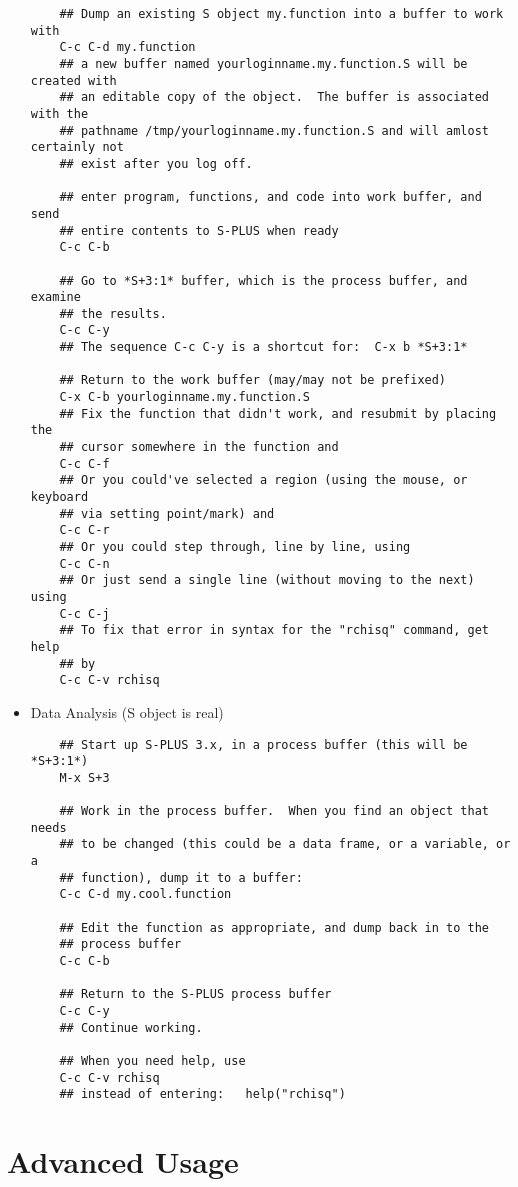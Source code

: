 \documentclass{article}
\begin{document}
\begin{itemize}
\begin{verbatim}
    ## Dump an existing S object my.function into a buffer to work with
    C-c C-d my.function
    ## a new buffer named yourloginname.my.function.S will be created with
    ## an editable copy of the object.  The buffer is associated with the
    ## pathname /tmp/yourloginname.my.function.S and will amlost certainly not
    ## exist after you log off.

    ## enter program, functions, and code into work buffer, and send
    ## entire contents to S-PLUS when ready
    C-c C-b

    ## Go to *S+3:1* buffer, which is the process buffer, and examine
    ## the results.
    C-c C-y
    ## The sequence C-c C-y is a shortcut for:  C-x b *S+3:1*

    ## Return to the work buffer (may/may not be prefixed)
    C-x C-b yourloginname.my.function.S
    ## Fix the function that didn't work, and resubmit by placing the
    ## cursor somewhere in the function and
    C-c C-f
    ## Or you could've selected a region (using the mouse, or keyboard 
    ## via setting point/mark) and 
    C-c C-r
    ## Or you could step through, line by line, using 
    C-c C-n
    ## Or just send a single line (without moving to the next) using
    C-c C-j
    ## To fix that error in syntax for the "rchisq" command, get help
    ## by
    C-c C-v rchisq
\end{verbatim}
\item Data Analysis (S object is real)
\begin{verbatim}
    ## Start up S-PLUS 3.x, in a process buffer (this will be *S+3:1*) 
    M-x S+3

    ## Work in the process buffer.  When you find an object that needs 
    ## to be changed (this could be a data frame, or a variable, or a 
    ## function), dump it to a buffer:
    C-c C-d my.cool.function

    ## Edit the function as appropriate, and dump back in to the
    ## process buffer  
    C-c C-b

    ## Return to the S-PLUS process buffer
    C-c C-y
    ## Continue working.

    ## When you need help, use 
    C-c C-v rchisq
    ## instead of entering:   help("rchisq")
\end{verbatim}
\end{itemize}


\section{Advanced Usage}
\label{sec:advanced}
\end{document}
